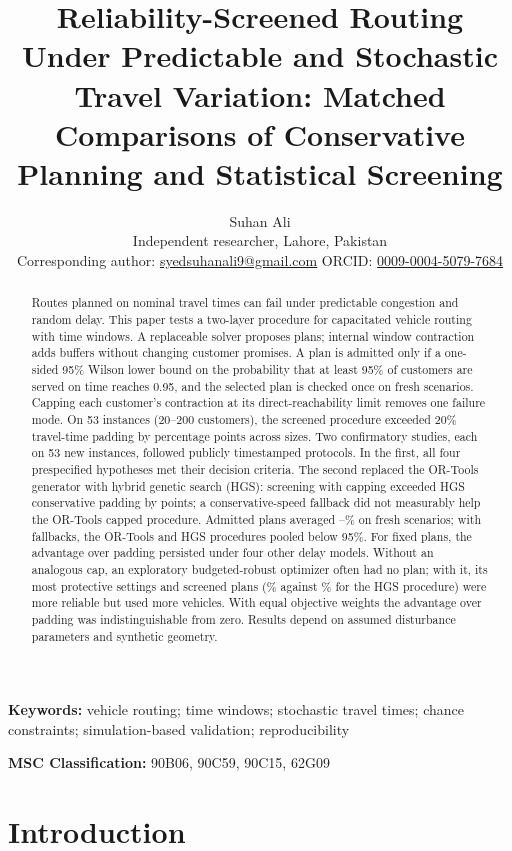 \documentclass[11pt,a4paper]{article}
\title{Reliability-Screened Routing Under Predictable and Stochastic Travel
Variation: Matched Comparisons of Conservative Planning and Statistical
Screening}
\author{Suhan Ali\\[4pt]
\small Independent researcher, Lahore, Pakistan\\
\small Corresponding author: \href{mailto:syedsuhanali9@gmail.com}{syedsuhanali9@gmail.com}\quad
ORCID: \href{https://orcid.org/0009-0004-5079-7684}{0009-0004-5079-7684}}
\date{}
\begin{document}
\maketitle

\begin{abstract}
Routes planned on nominal travel times can fail under predictable congestion and
random delay. This paper tests a two-layer procedure for capacitated vehicle
routing with time windows. A replaceable solver proposes plans; internal window
contraction adds buffers without changing customer promises. A plan is admitted
only if a one-sided 95\% Wilson lower bound on the probability that at least
95\% of customers are served on time reaches 0.95, and the selected plan is
checked once on fresh scenarios. Capping each customer's contraction at its
direct-reachability limit removes one failure mode. On 53 instances (20--200
customers), the screened procedure exceeded 20\% travel-time padding by
\ProcConsRange{} percentage points across sizes. Two confirmatory studies, each
on 53 new instances, followed publicly timestamped protocols. In the first, all
four prespecified hypotheses met their decision criteria. The second replaced
the OR-Tools generator with hybrid genetic search (HGS): screening with capping
exceeded HGS conservative padding by \CtwoGOneMean{} points; a
conservative-speed fallback did not measurably help the OR-Tools capped
procedure. Admitted plans averaged \AdmMeanMin--\AdmMeanMax\% on fresh
scenarios; with fallbacks, the OR-Tools and HGS procedures pooled below 95\%.
For fixed plans, the advantage over padding persisted under four other delay
models. Without an analogous cap, an exploratory budgeted-robust optimizer often
had no plan; with it, its most protective settings and screened plans
(\RobScreenedCapP\% against \RobHgsCappedP\% for the HGS procedure) were more
reliable but used more vehicles. With equal objective weights the advantage over
padding was indistinguishable from zero. Results depend on assumed disturbance
parameters and synthetic geometry.
\end{abstract}

{\raggedright\noindent\textbf{Keywords:} vehicle routing; time windows;
stochastic travel times; chance constraints; simulation-based validation;
reproducibility\par}

\medskip
\noindent\textbf{MSC Classification:} 90B06, 90C59, 90C15, 62G09

\clearpage

\section{Introduction}
\end{document}
